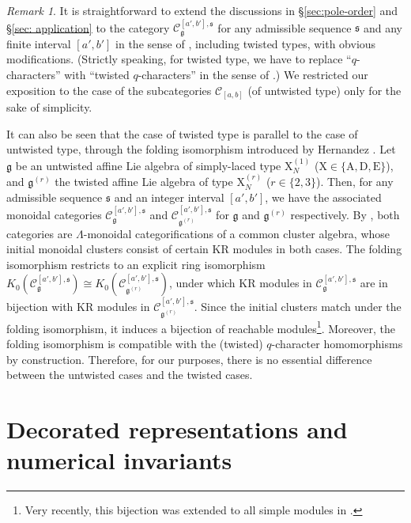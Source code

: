 \documentclass[12pt]{amsart}
\theoremstyle{definition}
\theoremstyle{remark}
\newtheorem{remark}[theorem]{Remark}
\numberwithin{equation}{section}
\begin{document}
\begin{remark} \label{rem:twisted-case}
It is straightforward to extend the discussions in \S\ref{sec:pole-order} and \S\ref{sec: application} 
to the category $\mathscr{C}_{\mathfrak{g}}^{[a',b'],\mathfrak{s}}$ for any admissible sequence $\mathfrak{s}$ and any finite interval $[a',b']$ in the sense of \cite[\S6]{kkop-2024}, including twisted types, with obvious modifications.
(Strictly speaking, for twisted type, we have to replace ``$q$-characters'' with ``twisted $q$-characters'' in the sense of \cite{Her10}.)
We restricted our exposition to the case of the subcategories $\mathcal{C}_{[a,b]}$ (of untwisted type) only for the sake of simplicity.

It can also be seen that the case of twisted type is parallel to the case of untwisted type, through the folding isomorphism introduced by Hernandez \cite{Her10}.
Let $\mathfrak{g}$ be an untwisted affine Lie algebra of simply-laced type $\mathrm{X}_N^{(1)}$ ($\mathrm{X} \in \{ \mathrm{A, D, E}\}$), and $\mathfrak{g}^{(r)}$ the twisted affine Lie algebra of type $\mathrm{X}_N^{(r)}$ ($r \in \{2,3\}$).
Then, for any admissible sequence $\mathfrak{s}$ and an integer interval $[a',b']$, we have the associated monoidal categories $\mathcal{C}^{[a',b'], \mathfrak{s}}_{\mathfrak{g}}$ and $\mathcal{C}^{[a',b'], \mathfrak{s}}_{\mathfrak{g}^{(r)}}$ for $\mathfrak{g}$ and $\mathfrak{g}^{(r)}$ respectively. 
By \cite{kkop-2024}, both categories are $\mathsf{\Lambda}$-monoidal categorifications of a common cluster algebra, whose initial monoidal clusters consist of certain KR modules in both cases.  
The folding isomorphism restricts to an explicit ring isomorphism $K_0(\mathcal{C}^{[a',b'], \mathfrak{s}}_{\mathfrak{g}}) \cong K_0(\mathcal{C}^{[a',b'], \mathfrak{s}}_{\mathfrak{g}^{(r)}})$, 
under which KR modules in $\mathcal{C}^{[a',b'], \mathfrak{s}}_{\mathfrak{g}}$ are in bijection with KR modules in $\mathcal{C}^{[a',b'], \mathfrak{s}}_{\mathfrak{g}^{(r)}}$.
Since the initial clusters match under the folding isomorphism, it induces a bijection of reachable modules\footnote{Very recently, this bijection was extended to all simple modules in \cite{NW26}.}.
Moreover, the folding isomorphism is compatible with the (twisted) $q$-character homomorphisms by construction.
Therefore, for our purposes, there is no essential difference between the untwisted cases and the twisted cases.  
\end{remark}




\appendix
\section{Decorated representations and numerical invariants}\label{sec: appendixA}
\end{document}
